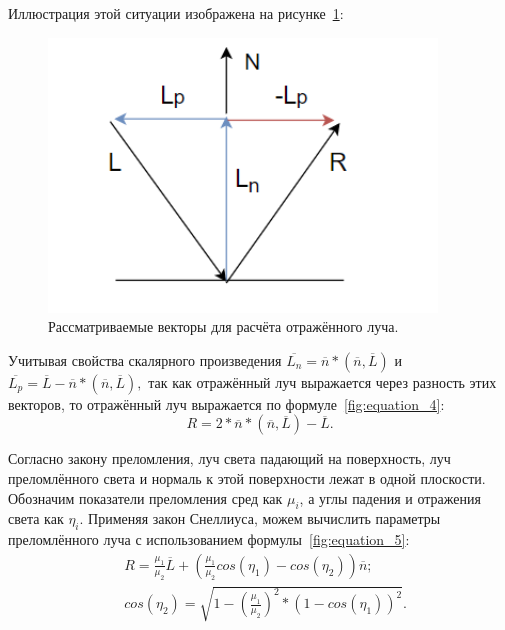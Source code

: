 Иллюстрация этой ситуации изображена на рисунке~\ref{fig:picture_2}:
\FloatBarrier
\begin{figure}[h]
	\begin{center}
		\includegraphics[]{photos/vectors.png}
	\end{center}
	\caption{Рассматриваемые векторы для расчёта отражённого луча.}
	\label{fig:picture_2}
\end{figure}
\FloatBarrier

Учитывая свойства скалярного произведения $ \overline{L_n} = \overline{n} * (\overline{n}, \overline{L}) $ и  $ \overline{L_p} = \overline{L} - \overline{n} * (\overline{n}, \overline{L}), $ так как отражённый луч выражается через разность этих векторов, то отражённый луч выражается по формуле~\ref{fig:equation_4}:
\begin{equation}
	R = 2*\overline{n}*(\overline{n}, \overline{L}) - \overline{L}.
	\label{fig:equation_4}
\end{equation}

Согласно закону преломления, луч света падающий на поверхность, луч преломлённого света и нормаль к этой поверхности лежат в одной плоскости.
Обозначим показатели преломления сред как $\mu_i$, а углы падения и отражения света как $\eta_i$. 
Применяя закон Снеллиуса, можем вычислить параметры преломлённого луча с использованием формулы~\ref{fig:equation_5}:
\begin{equation}
	\begin{aligned}
		& R = \frac{\mu_1}{\mu_2} \overline{L} + ( \frac{\mu_1}{\mu_2} cos(\eta_1) - cos(\eta_2))\overline{n}; \\ 
		& cos(\eta_2) = \sqrt{1 - (\frac{\mu_1}{\mu_2})^2 * (1 - cos(\eta_1))^2}.
	\end{aligned}
	\label{fig:equation_5}
\end{equation} 

